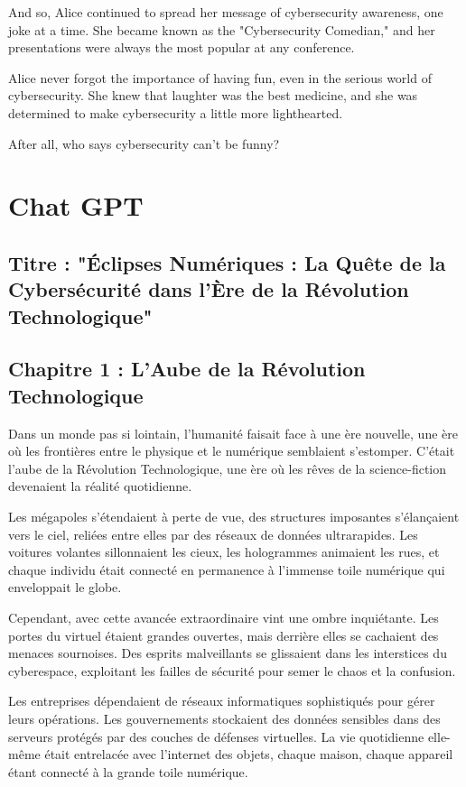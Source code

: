\documentclass{./StyCls/MyArticle}
\begin{document}
And so, Alice continued to spread her message of cybersecurity awareness, one joke at a time. She became known as the "Cybersecurity Comedian," and her presentations were always the most popular at any conference.

Alice never forgot the importance of having fun, even in the serious world of cybersecurity. She knew that laughter was the best medicine, and she was determined to make cybersecurity a little more lighthearted.

After all, who says cybersecurity can't be funny?

\section{Chat GPT}

\subsection{Titre : "Éclipses Numériques : La Quête de la Cybersécurité dans l'Ère de la Révolution Technologique"}

\subsection{Chapitre 1 : L'Aube de la Révolution Technologique}

Dans un monde pas si lointain, l'humanité faisait face à une ère nouvelle, une ère où les frontières entre le physique et le numérique semblaient s'estomper. C'était l'aube de la Révolution Technologique, une ère où les rêves de la science-fiction devenaient la réalité quotidienne.

Les mégapoles s'étendaient à perte de vue, des structures imposantes s'élançaient vers le ciel, reliées entre elles par des réseaux de données ultrarapides. Les voitures volantes sillonnaient les cieux, les hologrammes animaient les rues, et chaque individu était connecté en permanence à l'immense toile numérique qui enveloppait le globe.

Cependant, avec cette avancée extraordinaire vint une ombre inquiétante. Les portes du virtuel étaient grandes ouvertes, mais derrière elles se cachaient des menaces sournoises. Des esprits malveillants se glissaient dans les interstices du cyberespace, exploitant les failles de sécurité pour semer le chaos et la confusion.

Les entreprises dépendaient de réseaux informatiques sophistiqués pour gérer leurs opérations. Les gouvernements stockaient des données sensibles dans des serveurs protégés par des couches de défenses virtuelles. La vie quotidienne elle-même était entrelacée avec l'internet des objets, chaque maison, chaque appareil étant connecté à la grande toile numérique.
\end{document}

